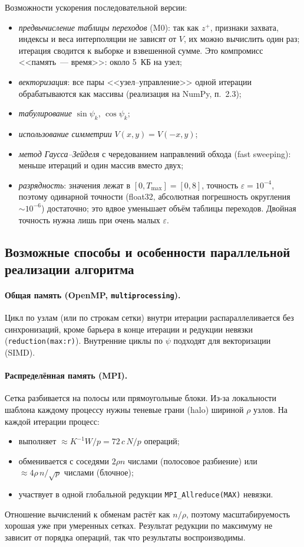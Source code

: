 \documentclass[14pt,a4paper]{extarticle}
\newcommand{\Tmax}{T_{\max}}
\begin{document}
Возможности ускорения последовательной версии:
\begin{itemize}
	\item \emph{предвычисление таблицы переходов} (M0): так как $z^{+}$,
	признаки захвата, индексы и веса интерполяции не зависят от $V$, их
	можно вычислить один раз; итерация сводится к выборке и взвешенной
	сумме. Это компромисс <<память~--- время>>: около 5~КБ на узел;
	\item \emph{векторизация}: все пары <<узел--управление>> одной
	итерации обрабатываются как массивы (реализация на NumPy, п.~2.3);
	\item \emph{табулирование} $\sin\psi_k$, $\cos\psi_k$;
	\item \emph{использование симметрии} $V(x,y)=V(-x,y)$;
	\item \emph{метод Гаусса--Зейделя} с чередованием направлений обхода
	(fast sweeping): меньше итераций и один массив вместо двух;
	\item \emph{разрядность}: значения лежат в $[0,\Tmax]=[0,8]$, точность
	$\varepsilon=10^{-4}$, поэтому одинарной точности (float32,
	абсолютная погрешность округления $\sim 10^{-6}$) достаточно; это
	вдвое уменьшает объём таблицы переходов. Двойная точность нужна лишь
	при очень малых $\varepsilon$.
\end{itemize}

\subsection{Возможные способы и особенности параллельной реализации алгоритма}

\paragraph{Общая память (OpenMP, \texttt{multiprocessing}).}
Цикл по узлам (или по строкам сетки) внутри итерации распараллеливается
без синхронизаций, кроме барьера в конце итерации и редукции невязки
(\texttt{reduction(max:r)}). Внутренние циклы по $\psi$ подходят для
векторизации (SIMD).

\paragraph{Распределённая память (MPI).}
Сетка разбивается на полосы или прямоугольные блоки. Из-за локальности
шаблона каждому процессу нужны теневые грани (halo) шириной $\rho$ узлов.
На каждой итерации процесс:
\begin{itemize}
	\item выполняет $\approx K^{-1}W/p = 72\,c\,N/p$ операций;
	\item обменивается с соседями $2\rho n$ числами (полосовое разбиение) или
	$\approx 4\rho\, n/\sqrt p$ числами (блочное);
	\item участвует в одной глобальной редукции \texttt{MPI\_Allreduce(MAX)}
	невязки.
\end{itemize}
Отношение вычислений к обменам растёт как $n/\rho$, поэтому
масштабируемость хорошая уже при умеренных сетках. Результат редукции
по максимуму не зависит от порядка операций, так что результаты
воспроизводимы.
\end{document}
